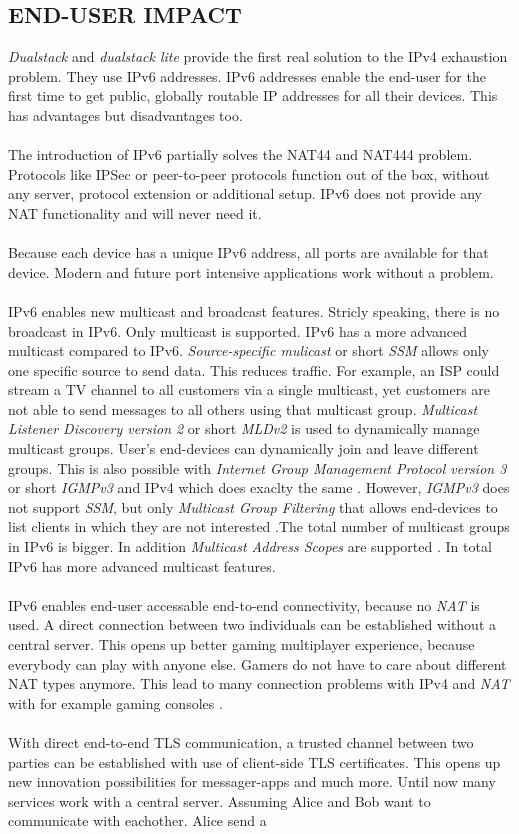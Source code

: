 \documentclass[format=sigconf, natbib=true, nonacm=true]{acmart}
\begin{document}
    \subsection*{END-USER IMPACT}
    \textit{Dualstack} and \textit{dualstack lite} provide the first real solution to the IPv4 exhaustion problem. They use IPv6 addresses. IPv6 addresses enable the end-user for the first time to get public, globally routable IP addresses for all their devices. This has advantages but disadvantages too.\\\\The introduction of IPv6 partially solves the NAT44 and NAT444 problem. Protocols like IPSec or peer-to-peer protocols function out of the box, without any server, protocol extension or additional setup. IPv6 does not provide any NAT functionality and will never need it.\\\\Because each device has a unique IPv6 address, all ports are available for that device. Modern and future port intensive applications work without a problem.\\\\IPv6 enables new multicast and broadcast features. Stricly speaking, there is no broadcast in IPv6. Only multicast is supported. IPv6 has a more advanced multicast compared to IPv6. \textit{Source-specific mulicast} or short \textit{SSM} allows only one specific source to send data. This reduces traffic. For example, an ISP could stream a TV channel to all customers via a single multicast, yet customers are not able to send messages to all others using that multicast group. \textit{Multicast Listener Discovery version 2} or short \textit{MLDv2} is used to dynamically manage multicast groups. User's end-devices can dynamically join and leave different groups. This is also possible with \textit{Internet Group Management Protocol version 3} or short \textit{IGMPv3} and IPv4 which does exaclty the same \cite{rfc3376}. However, \textit{IGMPv3} does not support \textit{SSM}, but only \textit{Multicast Group Filtering} that allows end-devices to list clients in which they are not interested .The total number of multicast groups in IPv6 is bigger. In addition \textit{Multicast Address Scopes} are supported \cite{rfc7346}. In total IPv6 has more advanced multicast features.\\\\IPv6 enables end-user accessable end-to-end connectivity, because no \textit{NAT} is used. A direct connection between two individuals can be established without a central server. This opens up better gaming multiplayer experience, because everybody can play with anyone else. Gamers do not have to care about different NAT types anymore. This lead to many connection problems with IPv4 and \textit{NAT} with for example gaming consoles \cite{XBOXNAT}.\\\\With direct end-to-end TLS communication, a trusted channel between two parties can be established with use of client-side TLS certificates. This opens up new innovation possibilities for messager-apps and much more. Until now many services work with a central server. Assuming Alice and Bob want to communicate with eachother. Alice send a 
\end{document}
